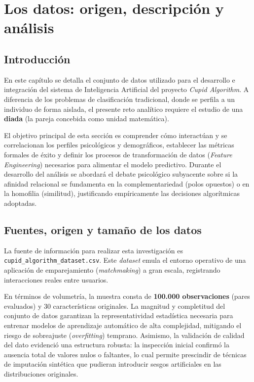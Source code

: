 
\chapter{Los datos: origen, descripción y análisis}
\label{cap:datos}

\section{Introducción}
\label{sec:introduccion_datos}
En este capítulo se detalla el conjunto de datos utilizado para el desarrollo e integración del sistema de Inteligencia Artificial del proyecto \textit{Cupid Algorithm}. A diferencia de los problemas de clasificación tradicional, donde se perfila a un individuo de forma aislada, el presente reto analítico requiere el estudio de una \textbf{diada} (la pareja concebida como unidad matemática). 

El objetivo principal de esta sección es comprender cómo interactúan y se correlacionan los perfiles psicológicos y demográficos, establecer las métricas formales de éxito y definir los procesos de transformación de datos (\textit{Feature Engineering}) necesarios para alimentar el modelo predictivo. Durante el desarrollo del análisis se abordará el debate psicológico subyacente sobre si la afinidad relacional se fundamenta en la complementariedad (polos opuestos) o en la homofilia (similitud), justificando empíricamente las decisiones algorítmicas adoptadas.

\section{Fuentes, origen y tamaño de los datos}
\label{sec:fuentes_datos}
La fuente de información para realizar esta investigación es \texttt{cupid\_algorithm\_dataset.csv}. Este \textit{dataset} emula el entorno operativo de una aplicación de emparejamiento (\textit{matchmaking}) a gran escala, registrando interacciones reales entre usuarios.

En términos de volumetría, la muestra consta de \textbf{100.000 observaciones} (pares evaluados) y 30 características originales. La magnitud y completitud del conjunto de datos garantizan la representatividad estadística necesaria para entrenar modelos de aprendizaje automático de alta complejidad, mitigando el riesgo de sobreajuste (\textit{overfitting}) temprano. Asimismo, la validación de calidad del dato evidenció una estructura robusta: la inspección inicial confirmó la ausencia total de valores nulos o faltantes, lo cual permite prescindir de técnicas de imputación sintética que pudieran introducir sesgos artificiales en las distribuciones originales.

